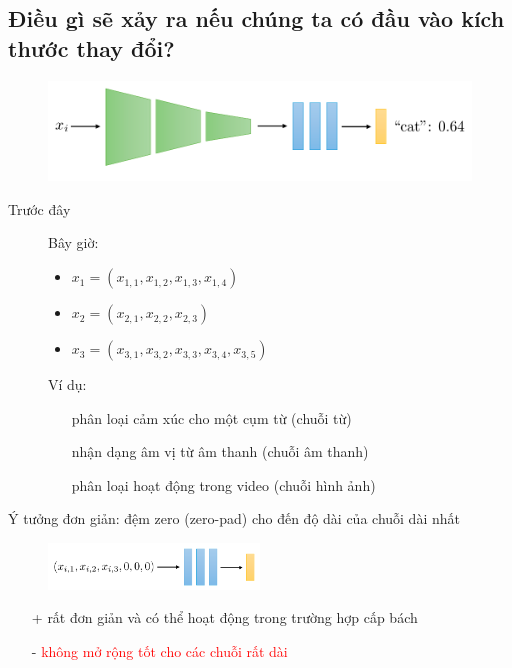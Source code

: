 \documentclass{book}
\begin{document}
\subsection{Điều gì sẽ xảy ra nếu chúng ta có đầu vào kích thước thay đổi?}\begin{figure}[H]
    \centering
    \includegraphics[width=\textwidth]{images/normal_networks_arch.png}
\end{figure}
Trước đây
\begin{figure}[H]
    \begin{minipage}[c]{0.45\textwidth}
        Bây giờ:
        \begin{itemize}
            \item $x_1=(x_{1, 1},x_{1, 2},x_{1, 3},x_{1, 4})$
            \item $x_2=(x_{2, 1},x_{2, 2},x_{2, 3})$
            \item $x_3=(x_{3, 1},x_{3, 2},x_{3,3},x_{3, 4},x_{3, 5})$
        \end{itemize}
    \end{minipage}
    \begin{minipage}[c]{0.5\textwidth}
        Ví dụ:
        \begin{itemize}
            \item[] phân loại cảm xúc cho một cụm từ (chuỗi từ)
            \item[] nhận dạng âm vị từ âm thanh (chuỗi âm thanh)
            \item[] phân loại hoạt động trong video (chuỗi hình ảnh)
        \end{itemize}
    \end{minipage}
\end{figure}
Ý tưởng đơn giản: đệm zero (zero-pad) cho đến độ dài của chuỗi dài nhất
\begin{figure}[H]
    \centering
    \includegraphics[width=0.5\textwidth]{images/normal_networks_arch_2.png}
\end{figure}
\begin{itemize}
    \item[+] \textcolor{Green4}{rất đơn giản và có thể hoạt động trong trường hợp cấp bách}
    \item[-] \textcolor{red}{không mở rộng tốt cho các chuỗi rất dài}
\end{itemize}
\end{document}

